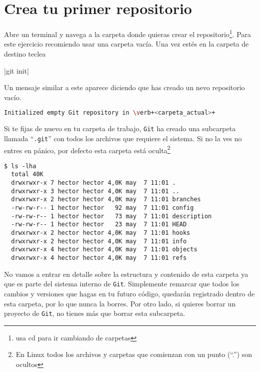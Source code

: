 \documentclass[a4paper,10pt]{report}
\begin{document}
  \section{Crea tu primer repositorio}
    Abre un terminal y navega a la carpeta donde quieras crear el repositorio\footnote{usa cd para ir cambiando de carpetas}. Para este ejercicio recomiendo usar una carpeta vacía. Una vez estés en la carpeta de destino teclea
    
    \cverb|git init|
  
    Un mensaje similar a este aparece diciendo que has creado un nevo repositorio vacío.
    
    \begin{lstlisting}[language=bash, frame=single, caption=Mensaje al inicializar git]
  Initialized empty Git repository in \verb+<carpeta_actual>+
    \end{lstlisting}
    Si te fijas de nuevo en tu carpeta de trabajo, \verb+Git+ ha creado una subcarpeta llamada ``\verb+.git+'' con todos los archivos que requiere el sistema. Si no la ves no entres en pánico, por defecto esta carpeta está oculta\footnote{En Linux todos los archivos y carpetas que comienzan con un punto (``.'') son ocultos}
  
    \begin{lstlisting}[frame=single, caption=Archivos y subcarpetas por defecto del sistema .git]
$ ls -lha
  total 40K
  drwxrwxr-x 7 hector hector 4,0K may  7 11:01 .
  drwxrwxr-x 3 hector hector 4,0K may  7 11:01 ..
  drwxrwxr-x 2 hector hector 4,0K may  7 11:01 branches
  -rw-rw-r-- 1 hector hector   92 may  7 11:01 config
  -rw-rw-r-- 1 hector hector   73 may  7 11:01 description
  -rw-rw-r-- 1 hector hector   23 may  7 11:01 HEAD
  drwxrwxr-x 2 hector hector 4,0K may  7 11:01 hooks
  drwxrwxr-x 2 hector hector 4,0K may  7 11:01 info
  drwxrwxr-x 4 hector hector 4,0K may  7 11:01 objects
  drwxrwxr-x 4 hector hector 4,0K may  7 11:01 refs
    \end{lstlisting}
  
    No vamos a entrar en detalle sobre la estructura y contenido de esta carpeta ya que es parte del sistema interno de \verb+Git+. Simplemente remarcar que todos los cambios y versiones que hagas en tu futuro código, quedarán registrado dentro de esta carpeta, por lo que nunca la borres. Por otro lado, si quieres borrar un proyecto de \verb+Git+, no tienes más que borrar esta subcarpeta.
  
\end{document}
